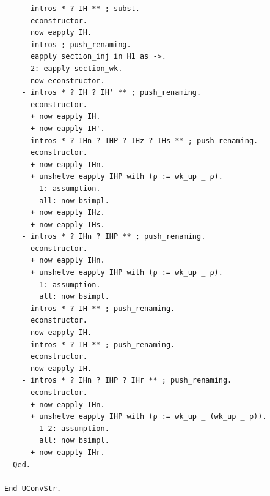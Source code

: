 \documentclass[10pt,a4paper]{amsart}
\begin{document}
\begin{lstlisting}
    - intros * ? IH ** ; subst.
      econstructor.
      now eapply IH.
    - intros ; push_renaming.
      eapply section_inj in H1 as ->.
      2: eapply section_wk.
      now econstructor.
    - intros * ? IH ? IH' ** ; push_renaming.
      econstructor.
      + now eapply IH.
      + now eapply IH'.
    - intros * ? IHn ? IHP ? IHz ? IHs ** ; push_renaming.
      econstructor.
      + now eapply IHn.
      + unshelve eapply IHP with (ρ := wk_up _ ρ).
        1: assumption.
        all: now bsimpl.
      + now eapply IHz.
      + now eapply IHs.
    - intros * ? IHn ? IHP ** ; push_renaming.
      econstructor.
      + now eapply IHn.
      + unshelve eapply IHP with (ρ := wk_up _ ρ).
        1: assumption.
        all: now bsimpl.
    - intros * ? IH ** ; push_renaming.
      econstructor.
      now eapply IH.
    - intros * ? IH ** ; push_renaming.
      econstructor.
      now eapply IH.
    - intros * ? IHn ? IHP ? IHr ** ; push_renaming.
      econstructor.
      + now eapply IHn.
      + unshelve eapply IHP with (ρ := wk_up _ (wk_up _ ρ)).
        1-2: assumption.
        all: now bsimpl.
      + now eapply IHr.
  Qed.

End UConvStr.
\end{lstlisting}
\end{document}
